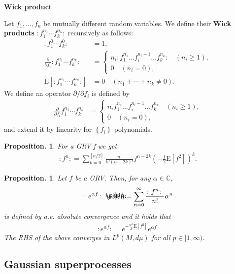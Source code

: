 \documentclass[openany, a4paper, oneside]{book}
\makeatletter
\newcommand*{\defeq}{\mathrel{\rlap{%
\raisebox{0.3ex}{$\m@th\cdot$}}%
\raisebox{-0.3ex}{$\m@th\cdot$}}%
=}
\theoremstyle{break}
\newtheorem{prop}[thm]{Proposition.}
\theoremstyle{breakdefn}
\newcommand{\rbk}[1]{\left (#1\right)}
\newcommand{\sqbk}[1]{\left[#1\right]}
\newcommand{\cbk}[1]{\left\{#1\right\}}
\newcommand{\bbC}{\mathbb{C}}
\newcommand{\E}[1]{\rmE\sqbk{#1}}
\newcommand{\rmE}{\mathrm{E}}
\newcommand{\wick}[1]{\colon #1 \colon}
\makeatother
\begin{document}
\vspace{1em}

\textbf{Wick product}

Let $f_1, \dots, f_n$ be mutually different random variables.
We define their \textbf{Wick products} $\wick{f_1^{n_1} \cdots f_k^{n_k}}$ recursively as follows:
\begin{align}
 \wick{f_1^{0} \cdots f_k^{0}}
 &= 1, \\
 \frac{\partial}{\partial f_i} \wick{f_1^{n_1} \cdots f_k^{n_k}}
 &=
 \begin{cases}
  n_i \wick{f_1^{n_1} \dots f_i^{n_i - 1} \dots f_k^{n_k}} \quad (n_i \geq 1), \\
  0 \quad (n_i = 0),
 \end{cases} \\
 \E{ \wick{f_1^{n_1} \cdots f_k^{n_k}} }
 &= 0 \quad (n_1 + \cdots + n_k \neq 0).
\end{align}
We define an operator $\partial / \partial f_i$ is defined by
\begin{align}
 \frac{\partial}{\partial f_i} f_1^{n_1} \cdots f_k^{n_k}
 &=
 \begin{cases}
  n_i  f_1^{n_1} \dots f_i^{n_i - 1} \dots f_k^{n_k} \quad (n_i \geq 1), \\
  0 \quad (n_i = 0),
 \end{cases}
\end{align}
and extend it by linearity for $\cbk{f_i}$ polynomials.

\begin{prop}
 For a GRV f we get
 \begin{align}
  \wick{f^n}
  =
  \sum_{k=0}^{\sqbk{n/2}} \frac{n!}{k! (n-2k)!} f^{n - 2k} \rbk{- \frac{1}{2} \E{f^2}}^k.
 \end{align}
\end{prop}
\begin{prop}
 Let $f$ be a GRV.
 Then, for any $\alpha \in \bbC$,
 \begin{align}
  \wick{e^{\alpha f}}
  \defeq
  \sum_{n=0}^{\infty} \frac{\wick{f^n}}{n!} \alpha^n
 \end{align}
 is defined by a.e. absolute convergence and it holds that
 \begin{align}
  \wick{e^{\alpha f}}
  =
  e^{- \frac{\alpha^2}{2} \E{f^2}} e^{\alpha f}.
 \end{align}
 The RHS of the above converges in $L^p (M, d \mu)$ for all $p \in [1, \infty)$.
\end{prop}
\subsection{Gaussian superprocesses}
\label{sec-8-2-2-2}
\end{document}
